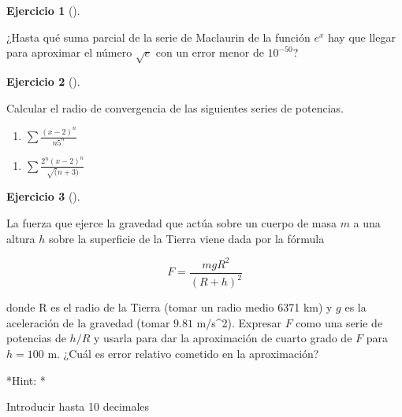 \documentclass[
  a4paper,
]{scrreport}
\providecommand{\tightlist}{%
  \setlength{\itemsep}{0pt}\setlength{\parskip}{0pt}}\usepackage{longtable,booktabs,array}
\theoremstyle{definition}
\newtheorem{exercise}{Ejercicio}[chapter]
\theoremstyle{remark}
\begin{document}
\begin{exercise}[]\protect\hypertarget{exr-series-propuesto-3}{}\label{exr-series-propuesto-3}

¿Hasta qué suma parcial de la serie de Maclaurin de la función \(e^x\)
hay que llegar para aproximar el número \(\sqrt{e}\) con un error menor
de \(10^{-50}\)?

\vspace{18pt}

\end{exercise}

\begin{exercise}[]\protect\hypertarget{exr-series-propuesto-4}{}\label{exr-series-propuesto-4}

Calcular el radio de convergencia de las siguientes series de potencias.

\begin{enumerate}
\def\labelenumi{\alph{enumi}.}
\tightlist
\item
  \(\sum \frac{(x-2)^n}{n5^n}\)
\end{enumerate}

\vspace{18pt}

\begin{enumerate}
\def\labelenumi{\alph{enumi}.}
\setcounter{enumi}{1}
\tightlist
\item
  \(\sum \frac{2^n(x-2)^n}{\sqrt(n+3)}\)
\end{enumerate}

\vspace{18pt}

\end{exercise}

\begin{exercise}[]\protect\hypertarget{exr-series-propuesto-5}{}\label{exr-series-propuesto-5}

La fuerza que ejerce la gravedad que actúa sobre un cuerpo de masa \(m\)
a una altura \(h\) sobre la superficie de la Tierra viene dada por la
fórmula

\[
F = \frac{mgR^2}{(R+h)^2}
\]

donde R es el radio de la Tierra (tomar un radio medio 6371 km) y \(g\)
es la aceleración de la gravedad (tomar \(9.81\) m/s\^{}2). Expresar
\(F\) como una serie de potencias de \(h/R\) y usarla para dar la
aproximación de cuarto grado de \(F\) para \(h=100\) m. ¿Cuál es error
relativo cometido en la aproximación?

\vspace{18pt}*Hint: *

Introducir hasta 10 decimales

\end{exercise}
\end{document}
